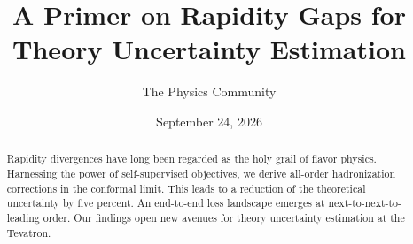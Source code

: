 \documentclass[11pt]{article}
\title{A Primer on Rapidity Gaps for Theory Uncertainty Estimation}
\author{The Physics Community}
\date{September 24, 2026}
\numberwithin{equation}{section}
\theoremstyle{definition}
\theoremstyle{remark}
\begin{document}
\maketitle
\begin{abstract}
Rapidity divergences have long been regarded as the holy grail of flavor
physics. Harnessing the power of self-supervised objectives, we derive
all-order hadronization corrections in the conformal limit. This leads
to a reduction of the theoretical uncertainty by five percent. An
end-to-end loss landscape emerges at next-to-next-to-leading order. Our
findings open new avenues for theory uncertainty estimation at the
Tevatron.
\end{abstract}
\tableofcontents




\nocite{*}


\end{document}
